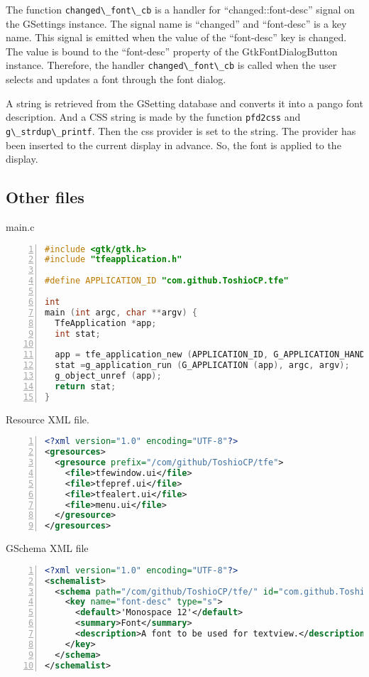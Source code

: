The function \passthrough{\lstinline!changed\_font\_cb!} is a handler
for ``changed::font-desc'' signal on the GSettings instance. The signal
name is ``changed'' and ``font-desc'' is a key name. This signal is
emitted when the value of the ``font-desc'' key is changed. The value is
bound to the ``font-desc'' property of the GtkFontDialogButton instance.
Therefore, the handler \passthrough{\lstinline!changed\_font\_cb!} is
called when the user selects and updates a font through the font dialog.

A string is retrieved from the GSetting database and converts it into a
pango font description. And a CSS string is made by the function
\passthrough{\lstinline!pfd2css!} and
\passthrough{\lstinline!g\_strdup\_printf!}. Then the css provider is
set to the string. The provider has been inserted to the current display
in advance. So, the font is applied to the display.

\subsection{Other files}\label{other-files}

main.c

\begin{lstlisting}[language=C, numbers=left]
#include <gtk/gtk.h>
#include "tfeapplication.h"

#define APPLICATION_ID "com.github.ToshioCP.tfe"

int
main (int argc, char **argv) {
  TfeApplication *app;
  int stat;

  app = tfe_application_new (APPLICATION_ID, G_APPLICATION_HANDLES_OPEN);
  stat =g_application_run (G_APPLICATION (app), argc, argv);
  g_object_unref (app);
  return stat;
}
\end{lstlisting}

Resource XML file.

\begin{lstlisting}[language=XML, numbers=left]
<?xml version="1.0" encoding="UTF-8"?>
<gresources>
  <gresource prefix="/com/github/ToshioCP/tfe">
    <file>tfewindow.ui</file>
    <file>tfepref.ui</file>
    <file>tfealert.ui</file>
    <file>menu.ui</file>
  </gresource>
</gresources>
\end{lstlisting}

GSchema XML file

\begin{lstlisting}[language=XML, numbers=left]
<?xml version="1.0" encoding="UTF-8"?>
<schemalist>
  <schema path="/com/github/ToshioCP/tfe/" id="com.github.ToshioCP.tfe">
    <key name="font-desc" type="s">
      <default>'Monospace 12'</default>
      <summary>Font</summary>
      <description>A font to be used for textview.</description>
    </key>
  </schema>
</schemalist>
\end{lstlisting}

